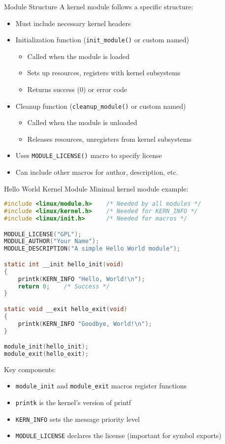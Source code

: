 \begin{definition}{Module Structure}
    A kernel module follows a specific structure:
    \begin{itemize}
        \item Must include necessary kernel headers
        \item Initialization function (\texttt{init\_module()} or custom named)
            \begin{itemize}
                \item Called when the module is loaded
                \item Sets up resources, registers with kernel subsystems
                \item Returns success (0) or error code
            \end{itemize}
        \item Cleanup function (\texttt{cleanup\_module()} or custom named)
            \begin{itemize}
                \item Called when the module is unloaded
                \item Releases resources, unregisters from kernel subsystems
            \end{itemize}
        \item Uses \texttt{MODULE\_LICENSE()} macro to specify license
        \item Can include other macros for author, description, etc.
    \end{itemize}
\end{definition}

\begin{code}{Hello World Kernel Module}
    Minimal kernel module example:
    
\begin{lstlisting}[language=C, style=basesmol]
#include <linux/module.h>    /* Needed by all modules */
#include <linux/kernel.h>    /* Needed for KERN_INFO */
#include <linux/init.h>      /* Needed for macros */

MODULE_LICENSE("GPL");
MODULE_AUTHOR("Your Name");
MODULE_DESCRIPTION("A simple Hello World module");

static int __init hello_init(void)
{
    printk(KERN_INFO "Hello, World!\n");
    return 0;    /* Success */
}

static void __exit hello_exit(void)
{
    printk(KERN_INFO "Goodbye, World!\n");
}

module_init(hello_init);
module_exit(hello_exit);
\end{lstlisting}

    Key components:
    \begin{itemize}
        \item \texttt{module\_init} and \texttt{module\_exit} macros register functions
        \item \texttt{printk} is the kernel's version of printf
        \item \texttt{KERN\_INFO} sets the message priority level
        \item \texttt{MODULE\_LICENSE} declares the license (important for symbol exports)
    \end{itemize}
\end{code}

